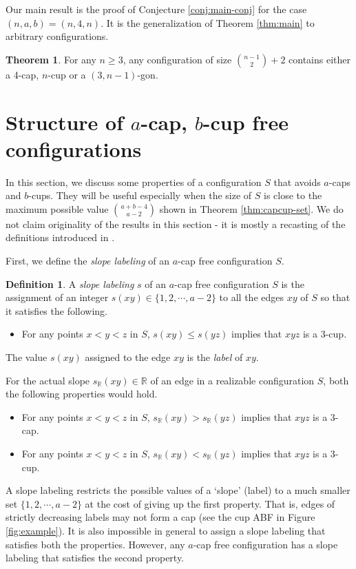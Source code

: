 \documentclass{amsart}
\newcommand{\RR}{\mathbb{R}}
\theoremstyle{definition}
\newtheorem{theorem}[thm]{Theorem}
\newtheorem{definition}[thm]{Definition}
\numberwithin{thm}{section}
\begin{document}
Our main result is the proof of Conjecture \ref{conj:main-conj}  for the case $(n, a, b) = (n, 4, n)$.
It is the generalization of Theorem \ref{thm:main} to arbitrary configurations.
\begin{theorem}
\label{thm:main-thm}
For any $n \geq 3$, any configuration of size $\binom{n-1}{2}+2$ contains either a 4-cap, $n$-cup or a $(3, n-1)$-gon.
\end{theorem}

\section{Structure of $a$-cap, $b$-cup free configurations}
\label{sec:statistic}

In this section, we discuss some properties of a configuration $S$ that avoids $a$-caps and $b$-cups.
They will be useful especially when the size of $S$ is close to the maximum possible value $\binom{a+b-4}{a-2}$ shown in Theorem \ref{thm:capcup-set}. 
We do not claim originality of the results in this section - it is mostly a recasting of the definitions introduced in \cite{moshkovitz2014ramsey}.

First, we define the \emph{slope labeling} of an $a$-cap free configuration $S$.
\begin{definition}
\label{def:label}
A \emph{slope labeling} $s$ of an $a$-cap free configuration $S$ is the assignment of an integer $s(xy) \in \{1, 2, \cdots, a - 2\}$ to all the edges $xy$ of $S$ so that it satisfies the following.
\begin{itemize}
	\item For any points $x < y < z$ in $S$, $s(xy) \leq s(yz)$ implies that $xyz$ is a 3-cup.
\end{itemize}
The value $s(xy)$ assigned to the edge $xy$ is the \emph{label} of $xy$.
\end{definition}

For the actual slope $s_\RR(xy) \in \RR$ of an edge in a realizable configuration $S$, both the following properties would hold.
\begin{itemize}
	\item For any points $x < y < z$ in $S$, $s_\RR(xy) > s_\RR(yz)$ implies that $xyz$ is a 3-cap.
	\item For any points $x < y < z$ in $S$, $s_\RR(xy) < s_\RR(yz)$ implies that $xyz$ is a 3-cup.
\end{itemize}

A slope labeling restricts the possible values of a `slope' (label) to a much smaller set $\{1, 2, \cdots, a - 2\}$ at the cost of giving up the first property. That is, edges of strictly decreasing labels may not form a cap (see the cup ABF in Figure \ref{fig:example}).
It is also impossible in general to assign a slope labeling that satisfies both the properties.
However, any $a$-cap free configuration has a slope labeling that satisfies the second property.
\end{document}
